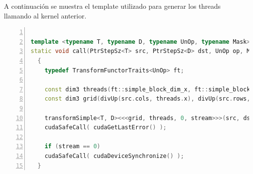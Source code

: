 \documentclass[a4paper,10pt]{report}
\begin{document}
% 
% 
% 












A continuación se muestra el template utilizado para generar los threads llamando al kernel anterior.



\begin{lstlisting}[frame=bt,title={aa},caption={gpu/include/opencv2/gpu/device/detail/transform\_detail.hpp},
columns=fullflexible,numbers=left,backgroundcolor=\color{LemonChiffon1},basicstyle=\footnotesize,keywordstyle=\ttfamily\footnotesize,language=C++,stringstyle=\ttfamily,breaklines=true,xleftmargin=0.5em,xrightmargin=0pt,aboveskip=\bigskipamount,belowskip=\bigskipamount]

template <typename T, typename D, typename UnOp, typename Mask>
static void call(PtrStepSz<T> src, PtrStepSz<D> dst, UnOp op, Mask mask, cudaStream_t stream)
  {
    typedef TransformFunctorTraits<UnOp> ft;

    const dim3 threads(ft::simple_block_dim_x, ft::simple_block_dim_y, 1);
    const dim3 grid(divUp(src.cols, threads.x), divUp(src.rows, threads.y), 1);

    transformSimple<T, D><<<grid, threads, 0, stream>>>(src, dst, mask, op);
    cudaSafeCall( cudaGetLastError() );

    if (stream == 0)
	cudaSafeCall( cudaDeviceSynchronize() );
  }
\end{lstlisting}
\end{document}

